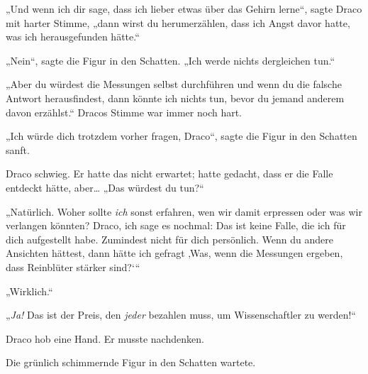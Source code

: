 „Und wenn ich dir sage, dass ich lieber etwas über das Gehirn lerne“, sagte Draco mit harter Stimme, „dann wirst du herumerzählen, dass ich Angst davor hatte, was ich herausgefunden hätte.“

„Nein“, sagte die Figur in den Schatten. „Ich werde nichts dergleichen tun.“

„Aber du würdest die Messungen selbst durchführen und wenn du die falsche Antwort herausfindest, dann könnte ich nichts tun, bevor du jemand anderem davon erzählst.“ Dracos Stimme war immer noch hart.

„Ich würde dich trotzdem vorher fragen, Draco“, sagte die Figur in den Schatten sanft.

Draco schwieg. Er hatte das nicht erwartet; hatte gedacht, dass er die Falle entdeckt hätte, aber… „Das würdest du tun?“

„Natürlich. Woher sollte \emph{ich} sonst erfahren, wen wir damit erpressen oder was wir verlangen könnten? Draco, ich sage es nochmal: Das ist keine Falle, die ich für dich aufgestellt habe. Zumindest nicht für dich persönlich. Wenn du andere Ansichten hättest, dann hätte ich gefragt ‚Was, wenn die Messungen ergeben, dass Reinblüter stärker sind?‘“

„Wirklich.“

„\emph{Ja!} Das ist der Preis, den \emph{jeder} bezahlen muss, um Wissenschaftler zu werden!“

Draco hob eine Hand. Er musste nachdenken.

Die grünlich schimmernde Figur in den Schatten wartete.

